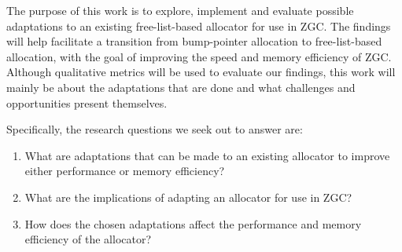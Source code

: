 
The purpose of this work is to explore, implement and evaluate possible adaptations to an existing free-list-based allocator for use in ZGC. The findings will help facilitate a transition from bump-pointer allocation to free-list-based allocation, with the goal of improving the speed and memory efficiency of ZGC. Although qualitative metrics will be used to evaluate our findings, this work will mainly be about the adaptations that are done and what challenges and opportunities present themselves.

Specifically, the research questions we seek out to answer are:

\begin{enumerate}
    \item What are adaptations that can be made to an existing allocator to improve either performance or memory efficiency?
    \item What are the implications of adapting an allocator for use in ZGC?
    \item How does the chosen adaptations affect the performance and memory efficiency of the allocator?
\end{enumerate}

